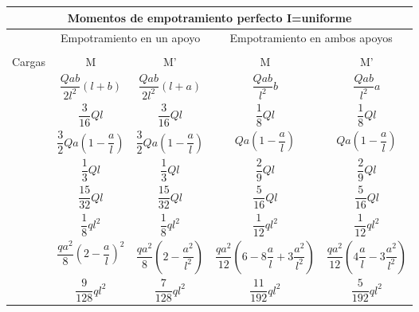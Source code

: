 \newpage
\begin{table}[H]
	\centering
	\resizebox{.95\textwidth}{!}
	{
		\begin{tabular}{m{4cm}cccc}
			\multicolumn{5}{c}{\Large  \textbf{Momentos de empotramiento perfecto} I=uniforme} \\ \toprule
			& \multicolumn{2}{c}{\large Empotramiento en un apoyo} & \multicolumn{2}{c}{\large Empotramiento en ambos apoyos} \\ \cmidrule{2-5} 
			&   &  & \multicolumn{2}{c}{} \\ \cmidrule{1-5}
			\multicolumn{1}{c}{\large{Cargas}} & \large{M} & \large{M'} & \large{M} & \large{M'} \\ \midrule
			 & \large{$\dfrac{Qab}{2l^2}(l+b)$} &  \large{$\dfrac{Qab}{2l^2}(l+a)$} & \large{$\dfrac{Qab}{l^2}b$} & \large{$\dfrac{Qab}{l^2}a$} \\ \midrule
			 & \large{$\dfrac{3}{16}Ql$} & \large{$\dfrac{3}{16}Ql$} & \large{$\dfrac{1}{8}Ql$} & \large{$\dfrac{1}{8}Ql$} \\ \midrule
			 & \large{$\dfrac{3}{2}Qa\left(1-\dfrac{a}{l}\right)$} & \large{$\dfrac{3}{2}Qa\left(1-\dfrac{a}{l}\right)$} & \large{$Qa\left(1-\dfrac{a}{l}\right)$} & \large{$Qa\left(1-\dfrac{a}{l}\right)$} \\ \midrule
			 & \large{$\dfrac{1}{3}Ql$} & \large{$\dfrac{1}{3}Ql$} & \large{$\dfrac{2}{9}Ql$} & \large{$\dfrac{2}{9}Ql$} \\ \midrule
			 & \large{$\dfrac{15}{32}Ql$} & \large{$\dfrac{15}{32}Ql$} & \large{$\dfrac{5}{16}Ql$} & \large{$\dfrac{5}{16}Ql$} \\ \midrule
			 & \large{$\dfrac{1}{8}ql^2$} & \large{$\dfrac{1}{8}ql^2$} & \large{$\dfrac{1}{12}ql^2$} & \large{$\dfrac{1}{12}ql^2$} \\ \midrule
			 & \large{$\dfrac{qa^2}{8}\left(2-\dfrac{a}{l}\right)^2$} & \large{$\dfrac{qa^2}{8}\left(2-\dfrac{a^2}{l^2}\right)$} & \large{$\dfrac{qa^2}{12}\left(6-8\dfrac{a}{l}+3\dfrac{a^2}{l^2}\right)$} & \large{$\dfrac{qa^2}{12}\left(4\dfrac{a}{l}-3\dfrac{a^2}{l^2}\right)$} \\ \midrule
			 & \large{$\dfrac{9}{128}ql^2$} & \large{$\dfrac{7}{128}ql^2$} & \large{$\dfrac{11}{192}ql^2$} & \large{$\dfrac{5}{192}ql^2$} \\ \midrule

\end{tabular}}
\end{table}

